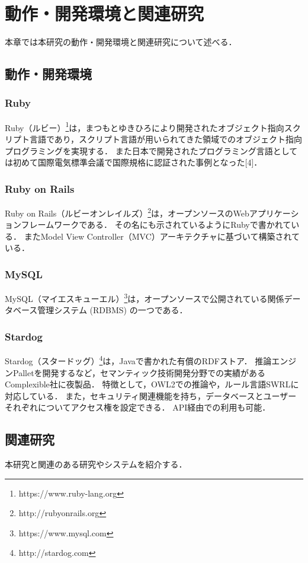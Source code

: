\chapter{動作・開発環境と関連研究}
本章では本研究の動作・開発環境と関連研究について述べる．

\section{動作・開発環境}

\subsection{Ruby}
Ruby（ルビー）\footnote{https://www.ruby-lang.org}は，まつもとゆきひろにより開発されたオブジェクト指向スクリプト言語であり，スクリプト言語が用いられてきた領域でのオブジェクト指向プログラミングを実現する．
また日本で開発されたプログラミング言語としては初めて国際電気標準会議で国際規格に認証された事例となった[4]．

\subsection{Ruby on Rails}
Ruby on Rails（ルビーオンレイルズ）\footnote{http://rubyonrails.org}は，オープンソースのWebアプリケーションフレームワークである．
その名にも示されているようにRubyで書かれている．
またModel View Controller（MVC）アーキテクチャに基づいて構築されている．

\subsection{MySQL}
MySQL（マイエスキューエル）\footnote{https://www.mysql.com}は，オープンソースで公開されている関係データベース管理システム (RDBMS) の一つである．

\subsection{Stardog}
Stardog（スタードッグ）\footnote{http://stardog.com}は，Javaで書かれた有償のRDFストア．
推論エンジンPalletを開発するなど，セマンティック技術開発分野での実績があるComplexible社に夜製品．
特徴として，OWL2での推論や，ルール言語SWRLに対応している．
また，セキュリティ関連機能を持ち，データベースとユーザーそれぞれについてアクセス権を設定できる．
API経由での利用も可能．

\section{関連研究}
本研究と関連のある研究やシステムを紹介する．

